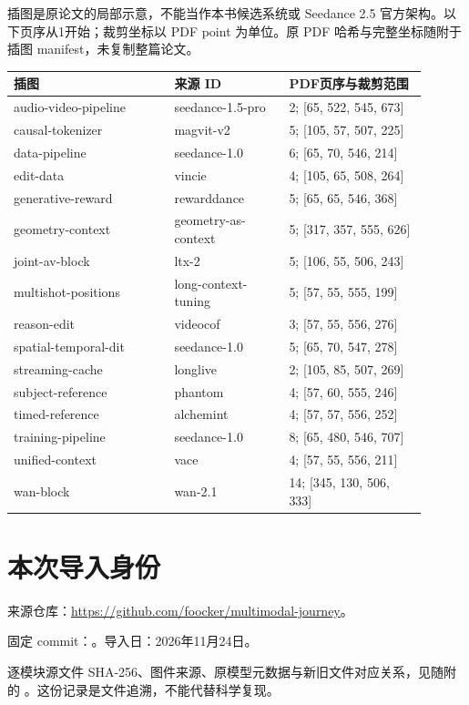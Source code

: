 插图是原论文的局部示意，不能当作本书候选系统或 Seedance 2.5 官方架构。以下页序从1开始；裁剪坐标以 PDF point 为单位。原 PDF 哈希与完整坐标随附于插图 manifest，未复制整篇论文。

\begin{longtable}{@{}p{0.35\linewidth}p{0.25\linewidth}p{0.30\linewidth}@{}}

\toprule 插图 & 来源 ID & PDF页序与裁剪范围 \\ \midrule\endhead

audio-video-pipeline & seedance-1.5-pro & 2; [65, 522, 545, 673] \\

causal-tokenizer & magvit-v2 & 5; [105, 57, 507, 225] \\

data-pipeline & seedance-1.0 & 6; [65, 70, 546, 214] \\

edit-data & vincie & 4; [105, 65, 508, 264] \\

generative-reward & rewarddance & 5; [65, 65, 546, 368] \\

geometry-context & geometry-as-context & 5; [317, 357, 555, 626] \\

joint-av-block & ltx-2 & 5; [106, 55, 506, 243] \\

multishot-positions & long-context-tuning & 5; [57, 55, 555, 199] \\

reason-edit & videocof & 3; [57, 55, 556, 276] \\

spatial-temporal-dit & seedance-1.0 & 5; [65, 70, 547, 278] \\

streaming-cache & longlive & 2; [105, 85, 507, 269] \\

subject-reference & phantom & 4; [57, 60, 555, 246] \\

timed-reference & alchemint & 4; [57, 57, 556, 252] \\

training-pipeline & seedance-1.0 & 8; [65, 480, 546, 707] \\

unified-context & vace & 4; [57, 55, 556, 211] \\

wan-block & wan-2.1 & 14; [345, 130, 506, 333] \\

\bottomrule\end{longtable}

\section{本次导入身份}

来源仓库：\url{https://github.com/foocker/multimodal-journey}。

固定 commit：。导入日：2026年11月24日。

逐模块源文件 SHA-256、图件来源、原模型元数据与新旧文件对应关系，见随附的 。这份记录是文件追溯，不能代替科学复现。
